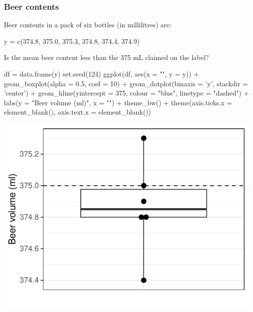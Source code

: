\documentclass[a4paper]{article}\usepackage[]{graphicx}\usepackage[]{xcolor}
\makeatletter
\def\maxwidth{ %
  \ifdim\Gin@nat@width>\linewidth
    \linewidth
  \else
    \Gin@nat@width
  \fi
}
\makeatother
\begin{document}
\subsubsection{Beer contents}
Beer contents in a pack of six bottles (in millilitres) are:
\begin{Schunk}
\begin{Sinput}
y = c(374.8, 375.0, 375.3, 374.8, 374.4, 374.9)
\end{Sinput}
\end{Schunk}
Is the mean beer content less than the 375 mL claimed on the label?
\begin{Schunk}
\begin{Sinput}
df = data.frame(y)
set.seed(124)
ggplot(df, aes(x = "", y = y)) +
  geom_boxplot(alpha = 0.5, coef = 10) + 
  geom_dotplot(binaxis = 'y', 
               stackdir = 'center') + 
  geom_hline(yintercept = 375, 
             colour = "blue",
             linetype = "dashed") + 
  labs(y = "Beer volume (ml)", x = "") +
  theme_bw() + 
  theme(axis.ticks.x = element_blank(),
        axis.text.x = element_blank())
\end{Sinput}


{\centering \includegraphics[width=\maxwidth]{figure/listings-unnamed-chunk-182-1} 

}

\end{Schunk}
\end{document}
